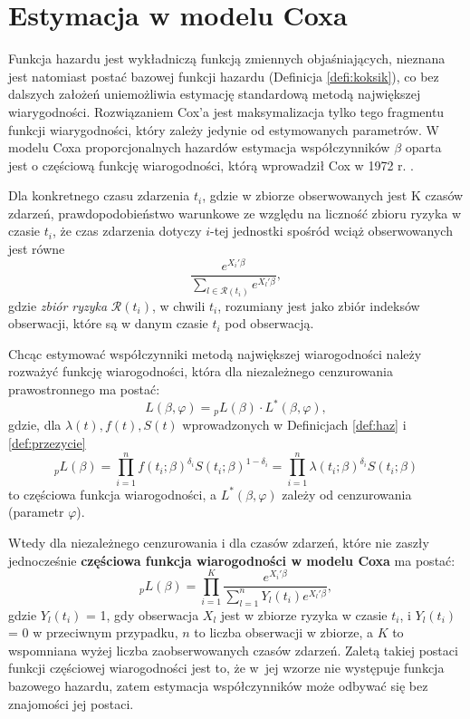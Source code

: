 \section{Estymacja w modelu Coxa}

Funkcja hazardu jest wykładniczą funkcją zmiennych objaśniających, nieznana jest natomiast
postać bazowej funkcji hazardu (Definicja \ref{defi:koksik}), co bez dalszych założeń uniemożliwia estymację standardową
metodą największej wiarygodności. Rozwiązaniem Cox’a jest maksymalizacja tylko tego fragmentu funkcji wiarygodności, który zależy jedynie od estymowanych parametrów. W modelu Coxa proporcjonalnych hazardów estymacja współczynników $\beta$ oparta jest o częściową funkcję wiarogodności, którą wprowadził Cox w 1972 r. \cite{cox}. 

Dla konkretnego czasu zdarzenia $t_i$, gdzie w zbiorze obserwowanych jest K czasów zdarzeń, prawdopodobieństwo warunkowe ze względu na liczność zbioru ryzyka w czasie $t_i$, że czas zdarzenia dotyczy $i$-tej jednostki spośród wciąż obserwowanych jest równe
\begin{equation}
\dfrac{e^{X_i'\beta}}{\sum\limits_{l\in \mathscr{R}(t_i)}^{}e^{X_l'\beta}},
\end{equation}
gdzie \textit{zbiór ryzyka} $\mathscr{R}(t_i)$, w chwili $t_i$, rozumiany jest jako zbiór indeksów obserwacji, które są w danym czasie $t_i$ pod obserwacją.

Chcąc estymować współczynniki metodą największej wiarogodności należy rozważyć funkcję wiarogodności, która dla niezależnego cenzurowania prawostronnego ma postać:
\begin{equation}
L(\beta,\varphi) =  {}_{p}L(\beta)\cdot L^{*}(\beta,\varphi),
\end{equation}
gdzie, dla $\lambda(t), f(t), S(t)$ wprowadzonych w Definicjach \ref{def:haz} i \ref{def:przezycie}
\begin{equation}
{}_{p}L(\beta) = \prod\limits_{i=1}^{n}f(t_i;\beta)^{\delta_i}S(t_i;\beta)^{1-\delta_i}=\prod\limits_{i=1}^{n}\lambda(t_i;\beta)^{\delta_i}S(t_i;\beta)
\end{equation}
to częściowa funkcja wiarogodności, a $L^{*}(\beta,\varphi)$ zależy od cenzurowania (parametr $\varphi$).

Wtedy dla niezależnego cenzurowania i dla czasów zdarzeń, które nie zaszły jednocześnie \textbf{częściowa funkcja wiarogodności w modelu Coxa} ma postać:
\begin{equation}
{}_{p}L(\beta) = \prod\limits_{i=1}^{K}\dfrac{e^{X_i'\beta}}{\sum\limits_{l=1}^{n}Y_l(t_i)e^{X_l'\beta}},
\end{equation}
gdzie $Y_l(t_i)$ = 1, gdy obserwacja $X_l$ jest w zbiorze ryzyka w czasie $t_i$, i $Y_l(t_i)$ = 0 w przeciwnym przypadku, $n$ to liczba obserwacji w zbiorze, a $K$ to wspomniana wyżej liczba zaobserwowanych czasów zdarzeń. Zaletą takiej postaci funkcji częściowej wiarogodności jest to, że w~jej wzorze nie występuje funkcja bazowego hazardu, zatem estymacja współczynników może odbywać się bez znajomości jej postaci.

